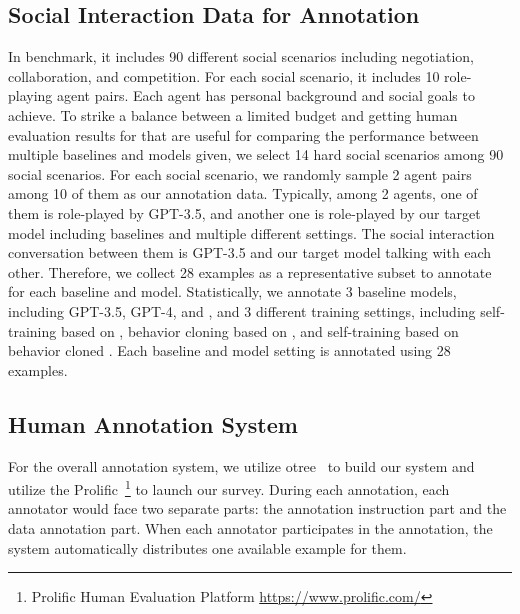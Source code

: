 \subsection{Social Interaction Data for Annotation}
\label{appendix:social-interaction-data-for-annotation}
In \sotopia benchmark, it includes 90 different social scenarios including negotiation, collaboration, and competition. For each social scenario, it includes 10 role-playing agent pairs. Each agent has personal background and social goals to achieve. To strike a balance between a limited budget and getting human evaluation results for \model that are useful for comparing the performance between multiple baselines and models given, we select 14 hard social scenarios among 90 social scenarios. For each social scenario, we randomly sample 2 agent pairs among 10 of them as our annotation data. Typically, among 2 agents, one of them is role-played by GPT-3.5, and another one is role-played by our target model including baselines and multiple different settings. The social interaction conversation between them is GPT-3.5 and our target model talking with each other. Therefore, we collect 28 examples as a representative subset to annotate for each baseline and model. Statistically, we annotate 3 baseline models, including GPT-3.5, GPT-4, and \mistral, and 3 different training settings, including self-training based on \mistral, behavior cloning based on \mistral, and self-training based on behavior cloned \mistral. Each baseline and model setting is annotated using 28 examples.


\subsection{Human Annotation System}
\label{appendix:human-annotation-system}
For the overall annotation system, we utilize otree~\cite{chen2016otree} to build our system and utilize the Prolific~\footnote{Prolific Human Evaluation Platform \href{https://www.prolific.com/}{https://www.prolific.com/}} to launch our survey. During each annotation, each annotator would face two separate parts: the annotation instruction part and the data annotation part. When each annotator participates in the annotation, the system automatically distributes one available example for them.

